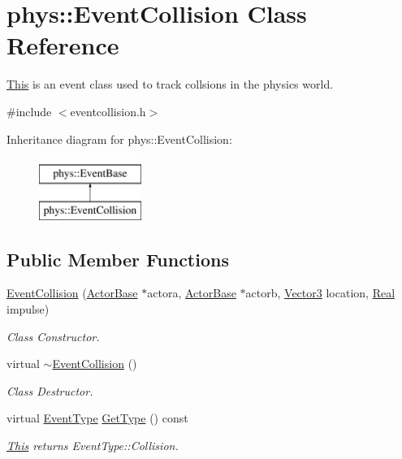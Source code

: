 \hypertarget{classphys_1_1EventCollision}{
\section{phys::EventCollision Class Reference}
\label{dd/de9/classphys_1_1EventCollision}
}


\hyperlink{structThis}{This} is an event class used to track collsions in the physics world.  




{\ttfamily \#include $<$eventcollision.h$>$}

Inheritance diagram for phys::EventCollision:\begin{figure}[H]
\begin{center}
\leavevmode
\includegraphics[height=2cm]{dd/de9/classphys_1_1EventCollision}
\end{center}
\end{figure}
\subsection*{Public Member Functions}
\begin{DoxyCompactItemize}
\item 
\hyperlink{classphys_1_1EventCollision_ac191dc44f83f6ddd2bff4f233b354372}{EventCollision} (\hyperlink{classphys_1_1ActorBase}{ActorBase} $\ast$actora, \hyperlink{classphys_1_1ActorBase}{ActorBase} $\ast$actorb, \hyperlink{classphys_1_1Vector3}{Vector3} location, \hyperlink{namespacephys_af7eb897198d265b8e868f45240230d5f}{Real} impulse)
\begin{DoxyCompactList}\small\item\em Class Constructor. \item\end{DoxyCompactList}\item 
virtual \hyperlink{classphys_1_1EventCollision_afcbf057fc955ce6c05b21c08325b1822}{$\sim$EventCollision} ()
\begin{DoxyCompactList}\small\item\em Class Destructor. \item\end{DoxyCompactList}\item 
virtual \hyperlink{classphys_1_1EventBase_a5e6a8564e127f654123f0bf6a2751923}{EventType} \hyperlink{classphys_1_1EventCollision_a96c2809f1bbab78b9f2758cea15a9a36}{GetType} () const 
\begin{DoxyCompactList}\small\item\em \hyperlink{structThis}{This} returns EventType::Collision. \item\end{DoxyCompactList}\end{DoxyCompactItemize}
